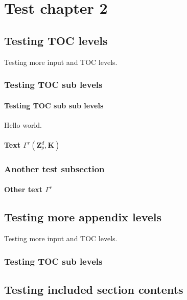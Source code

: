 \chapter{Test chapter 2}

\section{Testing TOC levels}
Testing more input and TOC levels.

\subsection{Testing TOC sub levels}

\subsubsection{Testing TOC sub sub levels}
Hello world.

\subsubsection{Text $\Gamma^{r}(\ensuremath{{\mathbf{Z}}}_p^d,\mathbf{K})$}

\subsection{Another test subsection}

\subsubsection{Other text $\Gamma^{r}$}

\section{Testing more appendix levels}
Testing more input and TOC levels.

\subsection{Testing TOC sub levels}

\section{Testing included section contents}


